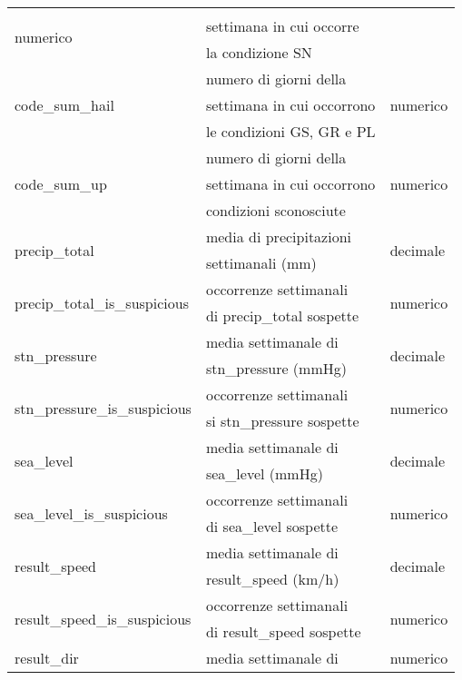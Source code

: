 \begin{longtable}{lll}
	\multirow{3}{*}{numerico} \\
	& settimana in cui occorre & \\ 	 
	& la condizione SN & \\ \hline
	\multirow{3}{*}{code\_sum\_hail}	& numero di giorni della & 
	\multirow{3}{*}{numerico} \\
	& settimana in cui occorrono & \\ 
	& le condizioni GS, GR e PL & \\ \hline
	\multirow{3}{*}{code\_sum\_up}	& numero di giorni della	 & 
	\multirow{3}{*}{numerico} \\
	& settimana in cui occorrono & \\ 	 
	& condizioni sconosciute & \\ \hline
	\multirow{2}{*}{precip\_total}		& media di precipitazioni 	 & 
	\multirow{2}{*}{decimale}			\\ 
	& settimanali (mm) &\\\hline	
	\multirow{2}{*}{precip\_total\_is\_suspicious}		& occorrenze 
	settimanali & \multirow{2}{*}{numerico}	\\
	& di precip\_total sospette	& \\\hline	
	\multirow{2}{*}{stn\_pressure}		& media settimanale	di  & 	
	\multirow{2}{*}{decimale}		\\ 
	& stn\_pressure (mmHg) &\\ \hline	
	\multirow{2}{*}{stn\_pressure\_is\_suspicious}		& occorrenze 
	settimanali & \multirow{2}{*}{numerico}	\\
	& si stn\_pressure sospette &	 \\ 	\hline	
	\multirow{2}{*}{sea\_level}		& media settimanale di 	 & 	
	\multirow{2}{*}{decimale}		\\ 
	& sea\_level (mmHg)&\\ \hline	
	\multirow{2}{*}{sea\_level\_is\_suspicious}		& occorrenze settimanali & 
	\multirow{2}{*}{numerico}	\\ 
	& di sea\_level sospette &	 \\	\hline
	\multirow{2}{*}{result\_speed}		& media settimanale di  
	&	\multirow{2}{*}{decimale}	\\ 
	& result\_speed (km/h) &\\	\hline	
	\multirow{2}{*}{result\_speed\_is\_suspicious}		& occorrenze 
	settimanali & \multirow{2}{*}{numerico}	\\
	& di result\_speed sospette & 	 \\	\hline	
	\multirow{2}{*}{result\_dir}	& media settimanale di  	& 	
	\multirow{2}{*}{numerico}	\\ 

\end{longtable}
